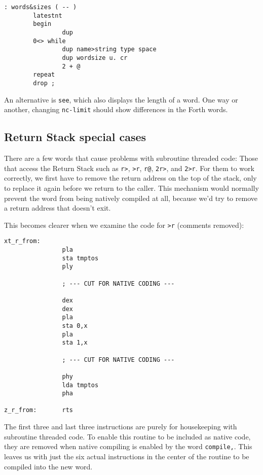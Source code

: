 \begin{lstlisting}[frame=lines]
: words&sizes ( -- )
        latestnt
        begin
                dup
        0<> while
                dup name>string type space
                dup wordsize u. cr
                2 + @
        repeat
        drop ;
\end{lstlisting}

\noindent An alternative is \texttt{see}, which also
displays the length of a word. One way or another, changing \texttt{nc-limit}
should show differences in the Forth words.

\subsection{Return Stack special cases}

There are a few words that cause problems with subroutine threaded
code: Those that access the Return Stack such as
\texttt{r>}, \texttt{>r},
\texttt{r@}, \texttt{2r>}, and
\texttt{2>r}. For them to work correctly, we first
have to remove the return address on the top of the stack, only to replace it
again before we return to the caller. This mechanism would normally prevent the
word from being natively compiled at all, because we'd
try to remove a return address that doesn't exit.

This becomes clearer when we examine the code for \texttt{>r} (comments
removed):

\begin{lstlisting}[frame=lines]
xt_r_from:
                pla
                sta tmptos
                ply

                ; --- CUT FOR NATIVE CODING ---

                dex
                dex
                pla
                sta 0,x
                pla
                sta 1,x

                ; --- CUT FOR NATIVE CODING ---
     
                phy
                lda tmptos
                pha

z_r_from:       rts
\end{lstlisting}

\noindent The first three and last three instructions are purely for
housekeeping with subroutine threaded code. To enable this routine to be
included as native code, they are removed when native compiling is enabled by
the word \texttt{compile,}. This leaves us
with just the six actual instructions in the center of the routine to be
compiled into the new word.

